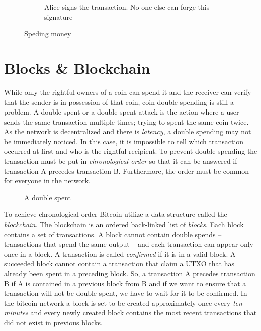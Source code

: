 \begin{figure}[ht!]
\begin{subfigure}[t]{0.50\textwidth}
    \caption{Alice signs the transaction. No one else can forge this signature}
    \label{fig:bl_spent:d}
  \end{subfigure}
  \caption{Speding money}
  \label{fig:bl_spent}
\end{figure}

\section{Blocks \& Blockchain}\label{blockchain:structure:blockchain}

While only the rightful owners of a coin can spend it and the receiver can verify that the sender is in possession of that coin, coin double spending is still a problem. A double spent or a double spent attack is the action where a user sends the same transaction multiple times; trying to spent the same coin twice. As the network is decentralized and there is \textit{latency}, a double spending may not be immediately noticed. In this case, it is impossible to tell which transaction occurred at first and who is the rightful recipient. To prevent double-spending the transaction must be put in \textit{chronological order} so that it can be answered if transaction A precedes transaction B. Furthermore, the order must be common for everyone in the network.

\begin{figure}[!ht]
  \centering
  \caption{A double spent}
  \label{fig:bl_tx:change}
\end{figure}

To achieve chronological order Bitcoin utilize a data structure called the \textit{blockchain}. The blockchain is an ordered back-linked list of \textit{blocks}. Each block contains a set of transactions. A block cannot contain double spends -- transactions that spend the same output -- and each transaction can appear only once in a block. A transaction is called \textit{confirmed} if it is in a valid block. A succeeded block cannot contain a transaction that claim a UTXO that has already been spent in a preceding block. So, a transaction A precedes transaction B if A is contained in a previous block from B and if we want to ensure that a transaction will not be double spent, we have to wait for it to be confirmed. In the bitcoin network a block is set to be created approximately once every \textit{ten minutes} and every newly created block contains the most recent transactions that did not exist in previous blocks.

